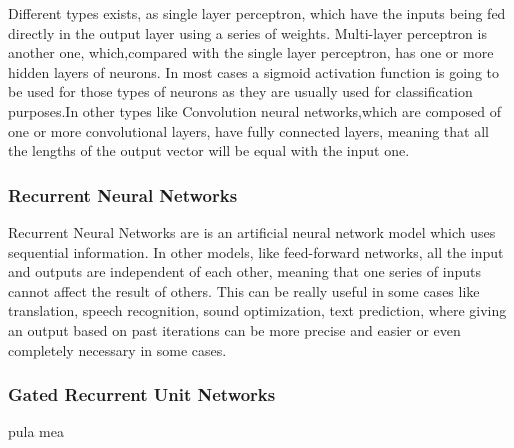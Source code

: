 Different types exists, as single layer perceptron, which have the inputs being fed directly in the output layer using a series of weights. Multi-layer perceptron is another one, which,compared with the single layer perceptron, has one or more hidden layers of neurons.
In most cases a sigmoid activation function is going to be used for those types of neurons as they are usually used for classification purposes.In other types like Convolution neural networks,which are composed of one or more convolutional layers, have fully connected layers, meaning that all the lengths of the output vector will be equal with the input one.

\subsubsection{Recurrent Neural Networks}

Recurrent Neural Networks are is an artificial neural network model which uses sequential information. In other models, like feed-forward networks, all the input and outputs are independent of each other, meaning that one series of inputs cannot affect the result of others.
This can be really useful in some cases like translation, speech recognition, sound optimization, text prediction, where giving an output based on past iterations can be more precise and easier or even completely necessary in some cases.

\subsubsection{Gated Recurrent Unit Networks} 

pula mea

